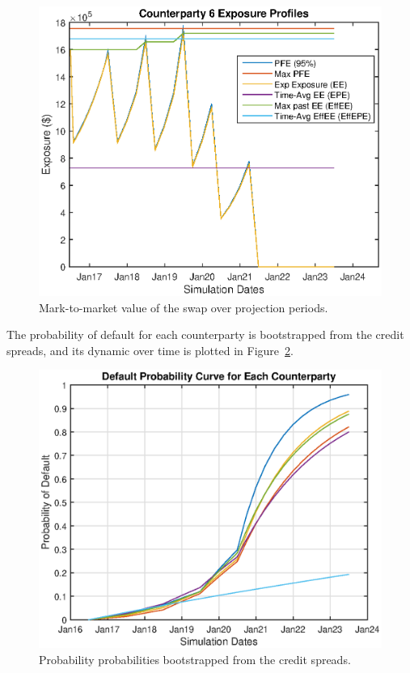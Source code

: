 \begin{center}
  \begin{figure}
  \centering
      \includegraphics[scale=0.6]{cva_exposure_profile.eps}
      \caption{Mark-to-market value of the swap over projection periods.}\label{fig::cva_exposure_profile}
  \end{figure}
\end{center} 

The probability of default for each counterparty is bootstrapped from the credit spreads, and its dynamic over time is plotted in Figure~\ref{fig::cva_default_prob}.

\begin{center}
  \begin{figure}
  \centering
      \includegraphics[scale=0.6]{cva_default_prob.eps}
      \caption{Probability probabilities bootstrapped from the credit spreads.}\label{fig::cva_default_prob}
  \end{figure}
\end{center}

